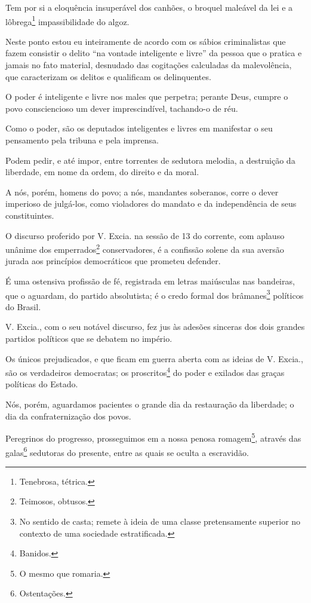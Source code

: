 Tem por si a eloquência insuperável dos canhões, o broquel maleável da
lei e a lôbrega\footnote{Tenebrosa, tétrica.} impassibilidade do
algoz.

Neste ponto estou eu inteiramente de acordo com os sábios criminalistas
que fazem consistir o delito ``na vontade inteligente e livre'' da pessoa
que o pratica e jamais no fato material, desnudado das cogitações
calculadas da malevolência, que caracterizam os delitos e qualificam os
delinquentes.

O poder é inteligente e livre nos males que perpetra; perante Deus,
cumpre o povo consciencioso um dever imprescindível, tachando-o de réu.

Como o poder, são os deputados inteligentes e livres em manifestar o seu
pensamento pela tribuna e pela imprensa.

Podem pedir, e até impor, entre torrentes de sedutora melodia, a
destruição da liberdade, em nome da ordem, do direito e da moral.

A nós, porém, homens do povo; a nós, mandantes soberanos, corre o dever
imperioso de julgá-los, como violadores do mandato e da independência de
seus constituintes.

O discurso proferido por V. Excia. na sessão de 13 do corrente, com
aplauso unânime dos emperrados\footnote{Teimosos, obtusos.}
conservadores, é a confissão solene da sua aversão jurada aos princípios
democráticos que prometeu defender.

É uma ostensiva profissão de fé, registrada em letras maiúsculas nas
bandeiras, que o aguardam, do partido absolutista; é o credo formal dos
brâmanes\footnote{No sentido de casta; remete à ideia de uma classe
  pretensamente superior no contexto de uma sociedade estratificada.}
políticos do Brasil.

V. Excia., com o seu notável discurso, fez jus às adesões sinceras dos
dois grandes partidos políticos que se debatem no império.

Os únicos prejudicados, e que ficam em guerra aberta com as ideias de V.
Excia., são os verdadeiros democratas; os proscritos\footnote{Banidos.}
do poder e exilados das graças políticas do Estado.

Nós, porém, aguardamos pacientes o grande dia da restauração da
liberdade; o dia da confraternização dos povos.

Peregrinos do progresso, prosseguimos em a nossa penosa
romagem\footnote{O mesmo que romaria.}, através das galas\footnote{
  Ostentações.} sedutoras do presente, entre as quais se oculta a
escravidão.

